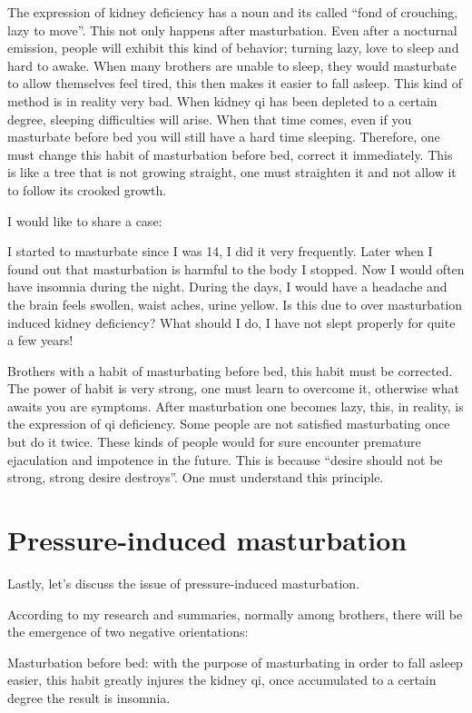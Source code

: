 \documentclass[
]{book}
\begin{document}
The expression of kidney deficiency has a noun and its called ``fond of crouching, lazy to move''. This not only happens after masturbation. Even
after a nocturnal emission, people will exhibit this kind of behavior; turning lazy, love to sleep and hard to awake. When many brothers are unable to sleep, they would masturbate to allow themselves feel tired, this then makes it easier to fall asleep. This kind of method is in reality very bad. When kidney qi has been depleted to a certain degree, sleeping difficulties will arise. When that time comes, even if you masturbate before bed you will still have a hard time sleeping. Therefore, one must change this habit of masturbation before bed, correct it immediately. This is like a tree that is not growing straight, one must straighten it and not allow it to follow its crooked growth.

I would like to share a case:

I started to masturbate since I was 14, I did it very frequently. Later when I found out that masturbation is harmful to the body I stopped. Now I would often have insomnia during the night. During the days, I would have a headache and the brain feels swollen, waist aches, urine yellow. Is this due to over masturbation induced kidney deficiency? What should I do, I have not slept properly for quite a few years!

Brothers with a habit of masturbating before bed, this habit must be corrected. The power of habit is very strong, one must learn to overcome it, otherwise what awaits you are symptoms. After masturbation one becomes lazy, this, in reality, is the expression of qi deficiency. Some people are not satisfied masturbating once but do it twice. These kinds of people would for sure encounter premature ejaculation and impotence in the future. This is because ``desire should not be strong, strong desire destroys''. One must understand this principle.

\hypertarget{pressure-induced-masturbation}{%
\section{Pressure-induced masturbation}\label{pressure-induced-masturbation}}

Lastly, let's discuss the issue of pressure-induced masturbation.

According to my research and summaries, normally among brothers, there will be the emergence of two negative orientations:

Masturbation before bed: with the purpose of masturbating in order to fall asleep easier, this habit greatly injures the kidney qi, once accumulated to a certain degree the result is insomnia.
\end{document}

